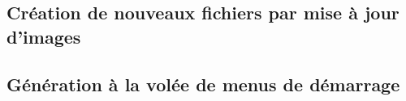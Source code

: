 \ml
{\section{\todo}}
{\section{Création de nouveaux fichiers par mise à jour d’images}}

\ml
{\section{\todo}}
{\section{Génération à la volée de menus de démarrage}}



\appendix

\chapter{\ml
{}
{}
}
\pagebreak




\singlespacing




